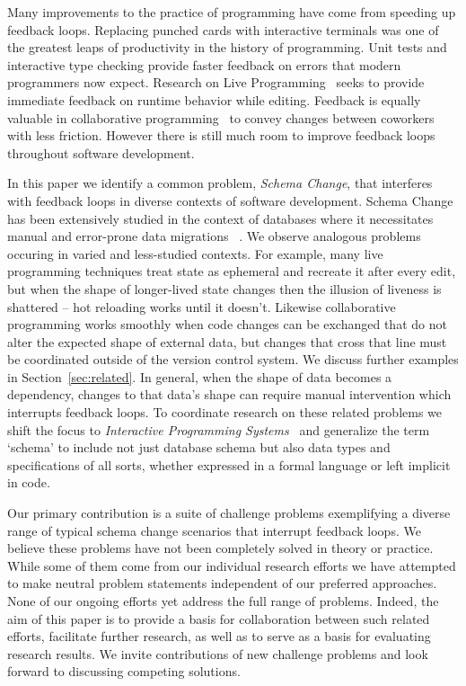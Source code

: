 \documentclass[english,crc]{programming}
\begin{document}
Many improvements to the practice of programming have come from speeding up feedback loops. Replacing punched cards with interactive terminals was one of the greatest leaps of productivity in the history of programming. Unit tests and interactive type checking provide faster feedback on errors that modern programmers now expect. Research on Live Programming~\cite{rein2018exploratory} seeks to provide immediate feedback on runtime behavior while editing. Feedback is equally valuable in collaborative programming~\cite{ProGit, goldman2011real,kurniawan2015coder,replit} to convey changes between coworkers with less friction.
However there is still much room to improve feedback loops throughout software development.

In this paper we identify a common problem, \emph{Schema Change}, that interferes with feedback loops in diverse contexts of software development. Schema Change has been extensively studied in the context of databases where it necessitates manual and error-prone data migrations ~\cite{erhard06}. We observe analogous problems occuring in varied and less-studied contexts. For example, many live programming techniques treat state as ephemeral and recreate it after every edit, but when the shape of longer-lived state changes then the illusion of liveness is shattered -- hot reloading works until it doesn't. Likewise collaborative programming works smoothly when code changes can be exchanged that do not alter the expected shape of external data, but changes that cross that line must be coordinated outside of the version control system. We discuss further examples in Section~\ref{sec:related}. In general, when the shape of data becomes a dependency, changes to that data's shape can require manual intervention which interrupts feedback loops. To coordinate research on these related problems we shift the focus to \emph{Interactive Programming Systems}~\cite{techdims} and generalize the term `schema' to include not just database schema but also data types and specifications of all sorts, whether expressed in a formal language or left implicit in code.

Our primary contribution is a suite of challenge problems exemplifying a diverse range of typical schema change scenarios that interrupt feedback loops. We believe these problems have not been completely solved in theory or practice. While some of them come from our individual research efforts we have attempted to make neutral problem statements independent of our preferred approaches. None of our ongoing efforts yet address the full range of problems. Indeed, the aim of this paper is to provide a basis for collaboration between such related efforts, facilitate further research, as well as to serve as a basis for evaluating research results. We invite contributions of new challenge problems and look forward to discussing competing solutions.
\end{document}
